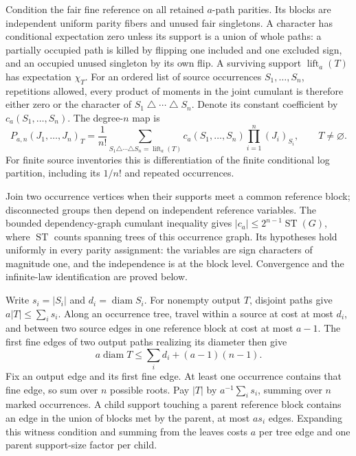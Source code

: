 Condition the fair fine reference on all retained \(a\)-path parities. Its
blocks are independent uniform parity fibers and unused fair singletons. A
character has conditional expectation zero unless its support is a union of
whole paths: a partially occupied path is killed by flipping one included
and one excluded sign, and an occupied unused singleton by its own flip. A
surviving support \(\operatorname{lift}_a(T)\) has expectation \(\chi_T\).
For an ordered list of source occurrences \(S_1,\ldots,S_n\), repetitions
allowed, every product of moments in the joint cumulant is therefore either
zero or the character of
\(S_1\mathbin\triangle\cdots\mathbin\triangle S_n\). Denote its constant
coefficient by \(c_a(S_1,\ldots,S_n)\). The degree-\(n\) map is
\begin{equation}
 P_{a,n}(J_1,\ldots,J_n)_T
 =\frac1{n!}\sum_{S_1\triangle\cdots\triangle S_n=\operatorname{lift}_a(T)}
 c_a(S_1,\ldots,S_n)\prod_{i=1}^n(J_i)_{S_i},\qquad T\ne\varnothing.
 \label{eq:rg-spatial-proof-cumulant-map}
\end{equation}
For finite source inventories this is differentiation of the finite
conditional log partition, including its \(1/n!\) and repeated
occurrences.

Join two occurrence vertices when their supports meet a common reference
block; disconnected groups then depend on independent reference variables.
The bounded dependency-graph cumulant inequality
\citep[Sec.~9.4.2, Eq.~(47)]{feray2016modphi} gives
\(|c_a|\le2^{n-1}\operatorname{ST}(G)\), where \(\operatorname{ST}\) counts
spanning trees of this occurrence graph. Its hypotheses hold uniformly in
every parity assignment: the variables are sign characters of magnitude one,
and the independence is at the block level. Convergence and the
infinite-law identification are proved below.

Write \(s_i=|S_i|\) and \(d_i=\operatorname{diam}S_i\). For nonempty output
\(T\), disjoint paths give \(a|T|\le\sum_is_i\). Along an occurrence tree,
travel within a source at cost at most \(d_i\), and between two source
edges in one reference block at cost at most \(a-1\). The first fine edges
of two output paths realizing its diameter then give
\begin{equation}
 a\operatorname{diam}T\le\sum_id_i+(a-1)(n-1).
 \label{eq:rg-spatial-proof-tree-diameter}
\end{equation}
Fix an output edge and its first fine edge. At least one occurrence
contains that fine edge, so sum over \(n\) possible roots. Pay \(|T|\) by
\(a^{-1}\sum_is_i\), summing over \(n\) marked occurrences. A child support
touching a parent reference block contains an edge in the union of blocks
met by the parent, at most \(as_i\) edges. Expanding this witness condition
and summing from the leaves costs \(a\) per tree edge and one parent
support-size factor per child.

